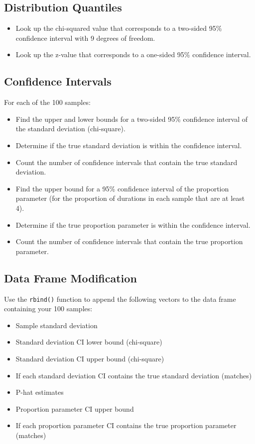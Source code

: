 \documentclass{article}
\begin{document}
\subsection{Distribution Quantiles}
\begin{itemize}
    \item Look up the chi-squared value that corresponds to a two-sided 95\% confidence interval with 9 degrees of freedom.
    \item Look up the z-value that corresponds to a one-sided 95\% confidence interval.
\end{itemize}

\subsection{Confidence Intervals}
For each of the 100 samples:
\begin{itemize}
    \item Find the upper and lower bounds for a two-sided 95\% confidence interval of the standard deviation (chi-square).
    \item Determine if the true standard deviation is within the confidence interval.
    \item Count the number of confidence intervals that contain the true standard deviation.
    \item Find the upper bound for a 95\% confidence interval of the proportion parameter (for the proportion of durations in each sample that are at least 4).
    \item Determine if the true proportion parameter is within the confidence interval.
    \item Count the number of confidence intervals that contain the true proportion parameter.
\end{itemize}

\subsection{Data Frame Modification}
Use the \texttt{rbind()} function to append the following vectors to the data frame containing your 100 samples:
\begin{itemize}
    \item Sample standard deviation
    \item Standard deviation CI lower bound (chi-square)
    \item Standard deviation CI upper bound (chi-square)
    \item If each standard deviation CI contains the true standard deviation (matches)
    \item P-hat estimates
    \item Proportion parameter CI upper bound
    \item If each proportion parameter CI contains the true proportion parameter (matches)
\end{itemize}
\end{document}
